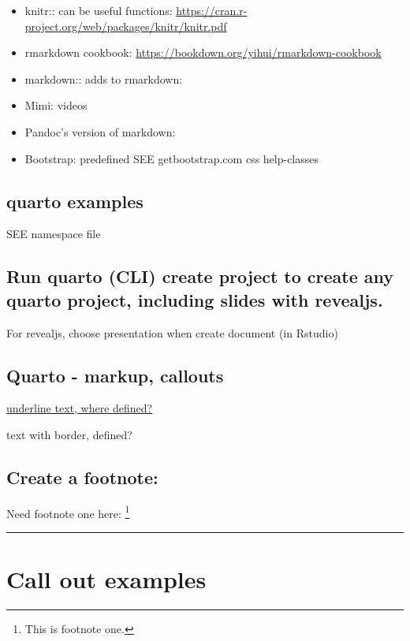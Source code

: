 \documentclass[
]{report}
\begin{document}
\begin{itemize}
\item
  knitr:: can be useful functions:
  \url{https://cran.r-project.org/web/packages/knitr/knitr.pdf}
\item
  rmarkdown cookbook:
  \url{https://bookdown.org/yihui/rmarkdown-cookbook}
\item
  markdown:: adds to rmarkdown:
\item
  Mimi: videos
\item
  Pandoc's version of markdown:
\item
  Bootstrap: predefined SEE getbootstrap.com css help-classes
\end{itemize}

\subsection{quarto examples}\label{quarto-examples}

SEE namespace file

\subsection{Run quarto (CLI) create project to create any quarto
project, including slides with
revealjs.}\label{run-quarto-cli-create-project-to-create-any-quarto-project-including-slides-with-revealjs.}

For revealjs, choose presentation when create document (in Rstudio)

\subsection{Quarto - markup, callouts}\label{quarto---markup-callouts}

\ul{underline text, where defined?}

{text with border, defined?}

\subsection{Create a footnote:}\label{create-a-footnote}

Need footnote one here: \footnote{This is footnote one.}

\begin{center}\rule{0.5\linewidth}{0.5pt}\end{center}

\section{Call out examples}\label{call-out-examples}
\end{document}
